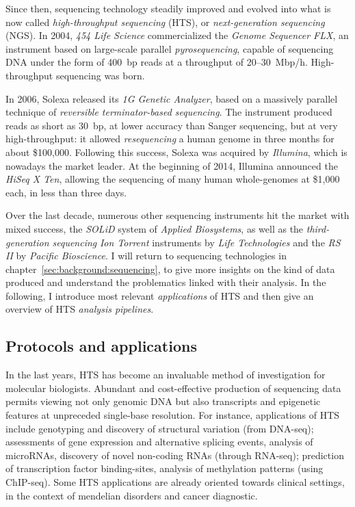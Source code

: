 Since then, sequencing technology steadily improved and evolved into what is now called \emph{high-throughput sequencing} (HTS), or \emph{next-generation sequencing} (NGS).
In 2004, \emph{454 Life Science} commercialized the \emph{Genome Sequencer FLX}, an instrument based on large-scale parallel \emph{pyrosequencing}, capable of sequencing DNA under the form of 400~bp reads at a throughput of 20--30~Mbp/h.
High-throughput sequencing was born.

In 2006, Solexa released its \emph{1G Genetic Analyzer}, based on a massively parallel technique of \emph{reversible terminator-based sequencing}.
The instrument produced reads as short as 30~bp, at lower accuracy than Sanger sequencing, but at very high-throughput: it allowed \emph{resequencing} a human genome in three months for about \$100,000.
Following this success, Solexa was acquired by \emph{Illumina}, which is nowadays the market leader.
At the beginning of 2014, Illumina announced the \emph{HiSeq X Ten}, allowing the sequencing of many human whole-genomes at \$1,000 each, in less than three days.

Over the last decade, numerous other sequencing instruments hit the market with mixed success, \eg the \emph{SOLiD} system of \emph{Applied Biosystems}, as well as the \emph{third-generation sequencing} \emph{Ion Torrent} instruments by \emph{Life Technologies} and the \emph{RS II} by \emph{Pacific Bioscience}.
I will return to sequencing technologies in chapter~\ref{sec:background:sequencing}, to give more insights on the kind of data produced and understand the problematics linked with their analysis.
In the following, I introduce most relevant \emph{applications} of HTS and then give an overview of HTS \emph{analysis pipelines}.

\subsection{Protocols and applications}

In the last years, HTS has become an invaluable method of investigation for molecular biologists.
Abundant and cost-effective production of sequencing data permits viewing not only genomic DNA but also transcripts and epigenetic features at unpreceded single-base resolution.
For instance, applications of HTS include genotyping and discovery of structural variation (from DNA-seq);
assessments of gene expression and alternative splicing events, analysis of microRNAs, discovery of novel non-coding RNAs (through RNA-seq);
prediction of transcription factor binding-sites, analysis of methylation patterns (using ChIP-seq).
Some HTS applications are already oriented towards clinical settings, \eg in the context of mendelian disorders and cancer diagnostic.


